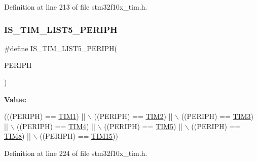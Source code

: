 Definition at line 213 of file stm32f10x\+\_\+tim.\+h.

\mbox{\label{group___t_i_m___exported__constants_ga90232c3966a578fbd9be2b228f225cb4}} 
\subsubsection{\texorpdfstring{I\+S\+\_\+\+T\+I\+M\+\_\+\+L\+I\+S\+T5\+\_\+\+P\+E\+R\+I\+PH}{IS\_TIM\_LIST5\_PERIPH}}
{\footnotesize\ttfamily \#define I\+S\+\_\+\+T\+I\+M\+\_\+\+L\+I\+S\+T5\+\_\+\+P\+E\+R\+I\+PH(\begin{DoxyParamCaption}\item[{}]{P\+E\+R\+I\+PH }\end{DoxyParamCaption})}

{\bfseries Value\+:}
\begin{DoxyCode}
(((PERIPH) == \hyperlink{group___peripheral__declaration_ga2e87451fea8dc9380056d3cfc5ed81fb}{TIM1}) || \(\backslash\)
                                     ((PERIPH) == \hyperlink{group___peripheral__declaration_ga3cfac9f2e43673f790f8668d48b4b92b}{TIM2}) || \(\backslash\)
                                     ((PERIPH) == \hyperlink{group___peripheral__declaration_ga61ee4c391385607d7af432b63905fcc9}{TIM3}) || \(\backslash\)
                                     ((PERIPH) == \hyperlink{group___peripheral__declaration_ga91a09bad8bdc7a1cb3d85cf49c94c8ec}{TIM4}) || \(\backslash\)
                                     ((PERIPH) == \hyperlink{group___peripheral__declaration_ga5125ff6a23a2ed66e2e19bd196128c14}{TIM5}) || \(\backslash\)
                                     ((PERIPH) == \hyperlink{group___peripheral__declaration_ga9a3660400b17735e91331f256095810e}{TIM8}) || \(\backslash\)
                                     ((PERIPH) == \hyperlink{group___peripheral__declaration_ga87e4b442041d1c03a6af113fbe04a182}{TIM15}))
\end{DoxyCode}


Definition at line 224 of file stm32f10x\+\_\+tim.\+h.

\mbox{\label{group___t_i_m___exported__constants_ga99fabffbddc9ca930f80a4480daeecbe}} 
